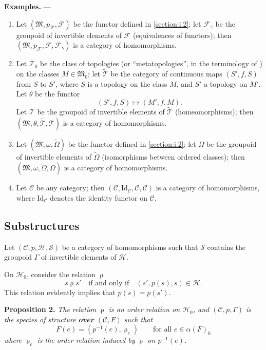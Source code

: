 \documentclass[fleqn]{article}
\newenvironment{itenv}[1]
  {\phantomsection\par\medskip\noindent\textbf{#1.}\itshape}
  {\par\medskip}
\newenvironment{rmenv}[1]
  {\phantomsection\par\medskip\noindent\textbf{#1.}\rmfamily}
  {\par\medskip}
\newcommand{\oldpage}[1]{\marginpar{\footnotesize$\Big\vert$ \textit{p.~#1}}}
\newcommand{\unsure}[1]{{\color{purple}\textbf{#1}}}
\newcommand{\CC}{\mathcal{C}}
\newcommand{\HH}{\mathcal{H}}
\renewcommand{\SS}{\mathcal{S}}
\newcommand{\MM}{\mathfrak{M}}
\newcommand{\FF}{\mathcal{F}}
\newcommand{\TT}{\mathcal{T}}
\newcommand{\relrho}{\mathrel{\rho}}
\newcommand{\Id}{\mathrm{Id}}
\begin{document}
\begin{rmenv}{Examples}
  ---
  \begin{enumerate}
    \item[1.]
      \oldpage{358}
      Let $(\MM,p_\FF,\FF)$ be the functor defined in \cref{section:i.2};
      let $\FF_\gamma$ be the groupoid of invertible elements of $\FF$ (equivalences of functors);
      then $(\MM,p_\FF,\FF,\FF_\gamma)$ is a category of homomorphisms.
    \item[2.]
      Let $\TT_0$ be the class of topologies (or ``metatopologies'', in the terminology of \cite{3b}) on the classes $M\in\MM_0$;
      let $\widetilde{\TT}$ be the category of continuous maps $(S',f,S)$ from $S$ to $S'$, where $S$ is a topology on the class $M$, and $S'$ a topology on $M'$.
      Let $\theta$ be the functor
      \[
        (S',f,S)
        \longmapsto(M',f,M).
      \]
      Let $\TT$ be the groupoid of invertible elements of $\widetilde{\TT}$ (homeomorphisms);
      then $(\MM,\theta,\widetilde{\TT},\TT)$ is a category of homomorphisms.
    \item[3.]
      Let $(\MM,\omega,\widetilde{\Omega})$ be the functor defined in \cref{section:i.2};
      let $\Omega$ be the groupoid of invertible elements of $\widetilde{\Omega}$ (isomorphisms between ordered classes);
      then $(\MM,\omega,\widetilde{\Omega},\Omega)$ is a category of homomorphisms.
    \item[4.]
      Let $\CC$ be any category;
      then $(\CC,\Id_\CC,\CC,\CC)$ is a category of homomorphisms, where $\Id_\CC$ denotes the identity functor on $\CC$.
  \end{enumerate}
\end{rmenv}



\subsection{Substructures}
\label{section:i.5}

Let $(\CC,p,\HH,\SS)$ be a category of homomorphisms such that $\SS$ contains the groupoid $\Gamma$ of invertible elements of $\HH$.

On $\HH_0$, consider the relation $\relrho$
\[
  s\relrho s'
  \quad\text{if and only if}\quad
  (s',p(s),s)\in\HH.
\]
This relation evidently implies that $p(s)=p(s')$.

\begin{itenv}{Proposition 2}
  The relation $\relrho$ is an order relation on $\HH_0$, and $(\CC,p,\Gamma)$ is the species of structure \unsure{over} $(\CC,F)$ such that
  \[
    F(e)
    = (p^{-1}(e),\relrho_e)
    \qquad\text{for all $e\in\alpha(F)_0$}
  \]
  where $\relrho_e$ is the order relation induced by $\relrho$ on $p^{-1}(e)$.
\end{itenv}
\end{document}
